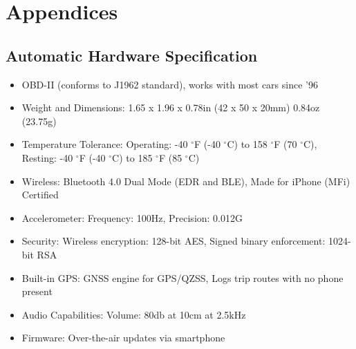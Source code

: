 \chapter{Appendices}
\section{Automatic Hardware Specification} %
\label{sec:automatic_hardware_specification}

\begin{itemize}
\item OBD-II (conforms to J1962 standard), works with most cars since ’96
\item Weight and Dimensions: 1.65 x 1.96 x 0.78in (42 x 50 x 20mm) 0.84oz (23.75g)
\item Temperature Tolerance: Operating: -40 \ensuremath{^\circ}F (-40 \ensuremath{^\circ}C) to 158 \ensuremath{^\circ}F (70 \ensuremath{^\circ}C), Resting: -40 \ensuremath{^\circ}F (-40 \ensuremath{^\circ}C) to 185 \ensuremath{^\circ}F (85 \ensuremath{^\circ}C)
\item Wireless: Bluetooth 4.0 Dual Mode (EDR and BLE), Made for iPhone (MFi) Certified
\item Accelerometer: Frequency: 100Hz, Precision: 0.012G
\item Security: Wireless encryption: 128-bit AES, Signed binary enforcement: 1024-bit RSA
\item Built-in GPS: GNSS engine for GPS/QZSS, Logs trip routes with no phone present
\item Audio Capabilities: Volume: 80db at 10cm at 2.5kHz
\item Firmware: Over-the-air updates via smartphone
\end{itemize}
